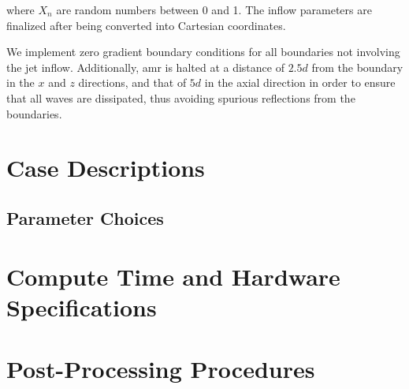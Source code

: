 \noindent where $X_n$ are random numbers between 0 and 1. The inflow parameters are finalized after being converted into Cartesian coordinates.

We implement zero gradient boundary conditions for all boundaries not involving the jet inflow. Additionally, \gls{amr} is halted at a distance of $2.5d$ from the boundary in the $x$ and $z$ directions, and that of $5d$ in the axial direction in order to ensure that all waves are dissipated, thus avoiding spurious reflections from the boundaries. 

\section{Case Descriptions}
\subsection{Parameter Choices}
\section{Compute Time and Hardware Specifications}
\section{Post-Processing Procedures}




